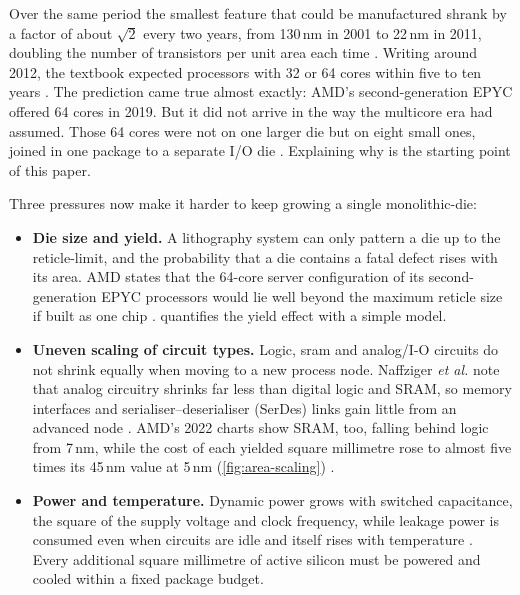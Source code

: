 Over the same period the smallest feature that could be manufactured shrank by a factor of about $\sqrt{2}$ every two years, from 130\,nm in 2001 to 22\,nm in 2011, doubling the number of transistors per unit area each time \cite[sec.~12.1.1, Table~12.1]{sarangi2025basic}. Writing around 2012, the textbook expected processors with 32 or 64 cores within five to ten years \cite[sec.~12.1.2]{sarangi2025basic}. The prediction came true almost exactly: AMD's second-generation EPYC offered 64 cores in 2019. But it did not arrive in the way the multicore era had assumed. Those 64 cores were not on one larger die but on eight small ones, joined in one package to a separate I/O die \cite{naffziger2020chiplet}. Explaining why is the starting point of this paper.

Three pressures now make it harder to keep growing a single \gls{monolithic-die}:

\begin{itemize}
  \item \textbf{Die size and yield.} A lithography system can only pattern a die up to the \gls{reticle-limit}, and the probability that a die contains a fatal defect rises with its area. AMD states that the 64-core server configuration of its second-generation EPYC processors would lie well beyond the maximum reticle size if built as one chip \cite{naffziger2020chiplet}.  quantifies the yield effect with a simple model.
  \item \textbf{Uneven scaling of circuit types.} Logic, \gls{sram} and analog/I-O circuits do not shrink equally when moving to a new process node. Naffziger \emph{et al.} note that analog circuitry shrinks far less than digital logic and SRAM, so memory interfaces and serialiser--deserialiser (SerDes) links gain little from an advanced node \cite{naffziger2020chiplet}. AMD's 2022 charts show SRAM, too, falling behind logic from 7\,nm, while the cost of each yielded square millimetre rose to almost five times its 45\,nm value at 5\,nm (\cref{fig:area-scaling}) \cite[slide~6]{wuu2022vcache}.
  \item \textbf{Power and temperature.} Dynamic power grows with switched capacitance, the square of the supply voltage and clock frequency, while leakage power is consumed even when circuits are idle and itself rises with temperature \cite[sec.~10.10]{sarangi2025basic}. Every additional square millimetre of active silicon must be powered and cooled within a fixed package budget.
\end{itemize}

